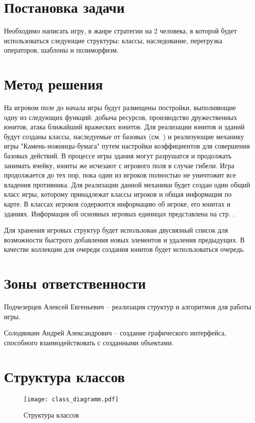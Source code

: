 \documentclass[a4paper,14pt]{article}
\begin{document}


\section{Постановка задачи}

Необходимо написать игру, в жанре стратегии на 2 человека, в которой будет использоваться следующие структуры: классы, наследование, перегрузка операторов, шаблоны и полиморфизм. 

\section{Метод решения}

На игровом поле до начала игры будут размещены постройки, выполняющие одну из следующих функций: добыча ресурсов, производство дружественных юнитов, атака ближайший вражеских юнитов. Для реализации юнитов и зданий будут созданы классы, наследуемые от базовых (см. ) и реализующие механику игры "Камень-ножницы-бумага" путем настройки коэффициентов для совершения базовых действий. В процессе игры здания могут разрушатся и продолжать занимать ячейку, юниты же исчезают с игрового поля в случае гибели. Игра продолжается до тех пор, пока один из игроков полностью не уничтожит все владения противника.
Для реализации данной механики будет создан один общий класс игры, которому принадлежат классы игроков и общая информация по карте. В классах игроков содержится информацию об игроке, его юнитах и зданиях. Информация об основных игровых единицах представлена на стр. \pageref{im:UML}.

Для хранения игровых структур будет использован двусвязный список для возможности быстрого добавления новых элементов и удаления предыдущих. В качестве коллекции для очереди создания юнитов будет использоваться очередь.

\section{Зоны ответственности}

Подчезерцев Алексей Евгеньевич -- реализация структур и алгоритмов для работы игры.

Солодянкин Андрей Александрович -- создание графического интерфейса, способного взаимодействовать с созданными объектами.

\section{Структура классов}

\begin{figure}[H]
	\centering
	\caption{Структура классов}
	\texttt{[image: class\_diagramm.pdf]}	
	\label{im:UML}
\end{figure}
\end{document}
